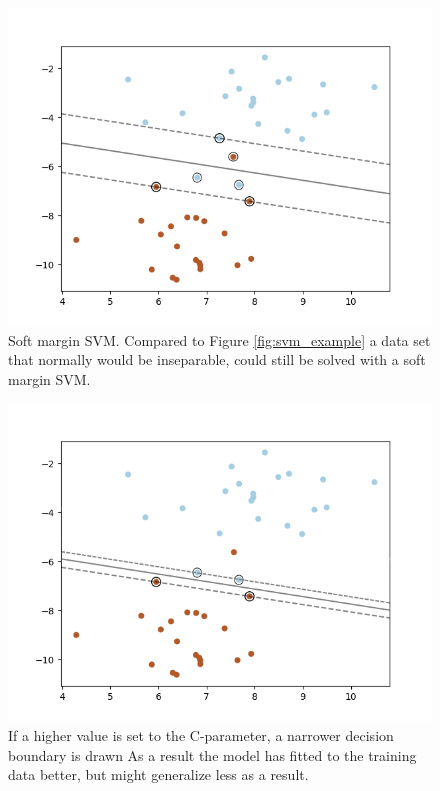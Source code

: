 \documentclass[a4paper,twoside]{bth}
\begin{document}
\begin{figure}
\centering
\includegraphics[scale=0.7]{images/intro-images/SVM_example_soft.png}
   \caption{Soft margin SVM. Compared to Figure \ref{fig:svm_example} a data set that normally would be inseparable, could still be solved with a soft margin SVM.}
   \label{fig:svm_soft_example}
\end{figure}

\begin{figure}
\centering
\includegraphics[scale=0.7]{images/intro-images/SVM_example_soft_harder.png}
   \caption{If a higher value is set to the C-parameter, a narrower decision boundary is drawn As a result the model has fitted to the training data better, but might generalize less as a result.}
   \label{fig:svm_harder_soft_example}
\end{figure}
\end{document}
